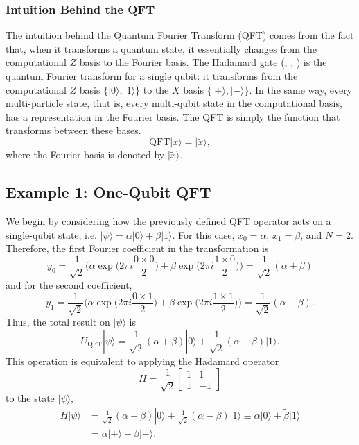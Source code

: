 \documentclass[a4paper]{article}
\begin{document}
\subsubsection{Intuition Behind the QFT}
The intuition behind the Quantum Fourier Transform (QFT) comes from the fact that, when it transforms a quantum state, it essentially changes from the computational $Z$ basis to the Fourier basis. The Hadamard gate (\cite{Medina}, \cite{Qiskit}, \cite{Nielsen}) is the quantum Fourier transform for a single qubit: it transforms from the computational $Z$ basis $\{|0\rangle, |1\rangle\}$ to the $X$ basis $\{|+\rangle, |-\rangle \}$. In the same way, every multi-particle state, that is, every multi-qubit state in the computational basis, has a representation in the Fourier basis. The QFT is simply the function that transforms between these bases.
\begin{equation}
\text{QFT}|x\rangle = |\tilde{x}\rangle,
\end{equation}
where the Fourier basis is denoted by $|\tilde{x}\rangle$.

\subsection{Example 1: One-Qubit QFT}
We begin by considering how the previously defined QFT operator acts on a single-qubit state, i.e. $|\psi\rangle=\alpha|0\rangle+\beta |1\rangle$. For this case, $x_0=\alpha$, $x_1=\beta$, and $N=2$. Therefore, the first Fourier coefficient in the transformation is
\begin{equation}
y_0=\frac{1}{\sqrt{2}}\Bigg( \alpha \exp\bigg( 2\pi i \frac{0\times 0}{2} \bigg) + \beta \exp\bigg( 2\pi i \frac{1\times 0}{2} \bigg) \Bigg)=\frac{1}{\sqrt{2}}(\alpha+\beta)
\end{equation}
and for the second coefficient,
\begin{equation}
y_1=\frac{1}{\sqrt{2}}\Bigg( \alpha \exp\bigg( 2\pi i \frac{0\times 1}{2} \bigg) + \beta \exp\bigg( 2\pi i \frac{1\times 1}{2} \bigg) \Bigg)=\frac{1}{\sqrt{2}}(\alpha-\beta).
\end{equation}
Thus, the total result on $|\psi\rangle$ is
\begin{equation}
U_{\text{QFT}}|\psi\rangle=\frac{1}{\sqrt{2}}(\alpha+\beta)|0\rangle + \frac{1}{\sqrt{2}}(\alpha-\beta)|1\rangle.
\end{equation}
This operation is equivalent to applying the Hadamard operator
\begin{equation}\label{eq::Hadamard_gate}
H=\frac{1}{\sqrt{2}}
\begin{bmatrix}
1&1\\
1&-1
\end{bmatrix}
\end{equation}
to the state $\vert \psi\rangle$,
\begin{equation}
\begin{aligned}
H\vert\psi\rangle&=\frac{1}{\sqrt{2}}(\alpha+\beta)|0\rangle + \frac{1}{\sqrt{2}}(\alpha-\beta)|1\rangle\equiv \tilde{\alpha}\vert 0\rangle+ \tilde{\beta}\vert 1\rangle\\
&=\alpha \vert + \rangle +\beta \vert - \rangle.
\end{aligned}
\end{equation}
\end{document}
